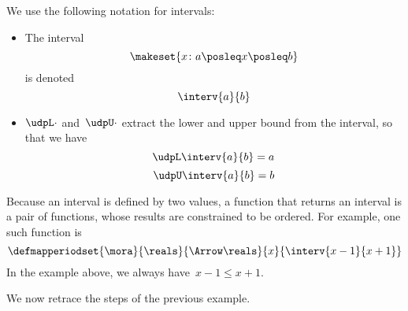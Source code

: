 We use the following notation for intervals:
\begin{itemize}
    \item The interval
          \begin{equation}
              \label{eq:interv-1}
              \makeset{x\colon a \posleq x \posleq b}
          \end{equation}
          is denoted
          \begin{equation}
              \label{eq:interv-2}
              \interv{a}{b}
          \end{equation}
    \item $\udpL\cdot$ and~$\udpU\cdot$ extract the lower and upper bound from the interval, so that we have
          \begin{equation}
              \label{eq:interv-L}
              \udpL \interv{a}{b} = a
          \end{equation}
          \begin{equation}
              \label{eq:interv-U}
              \udpU \interv{a}{b} = b
          \end{equation}
\end{itemize}
%
Because an interval is defined by two values, a function that returns an interval is a pair of functions, whose results are constrained to be ordered.
For example, one such function is
\begin{equation}
    \label{eq:interval-func-example}
    \defmapperiodset{\mora}{\reals}{\Arrow\reals}%
    {x}{ \interv{x-1}{x+1}
    }
\end{equation}
In the example above, we always have~$x-1\leq x+1$.

We now retrace the steps of the previous example.

